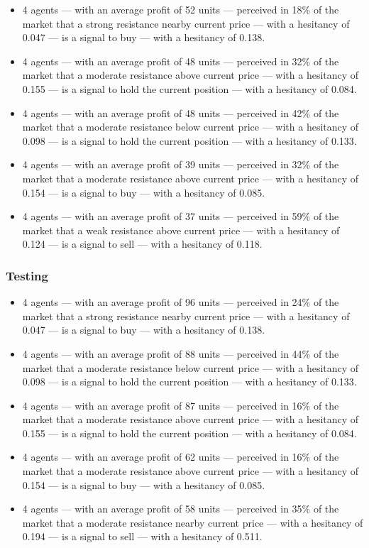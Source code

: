 {\small
  \begin{itemize}
  \item 4 agents — with an average profit of 52 units — perceived in 18\% of the
    market that a strong resistance nearby current price — with a hesitancy of
    0.047 — is a signal to buy — with a hesitancy of 0.138.
  \item 4 agents — with an average profit of 48 units — perceived in 32\% of the
    market that a moderate resistance above current price — with a hesitancy of
    0.155 — is a signal to hold the current position — with a hesitancy of
    0.084.
  \item 4 agents — with an average profit of 48 units — perceived in 42\% of the
    market that a moderate resistance below current price — with a hesitancy of
    0.098 — is a signal to hold the current position — with a hesitancy of
    0.133.
  \item 4 agents — with an average profit of 39 units — perceived in 32\% of the
    market that a moderate resistance above current price — with a hesitancy of
    0.154 — is a signal to buy — with a hesitancy of 0.085.
  \item 4 agents — with an average profit of 37 units — perceived in 59\% of the
    market that a weak resistance above current price — with a hesitancy of
    0.124 — is a signal to sell — with a hesitancy of 0.118.
  \end{itemize}
}

\subsubsection{Testing}

{\small
  \begin{itemize}
  \item 4 agents — with an average profit of 96 units — perceived in 24\% of the
    market that a strong resistance nearby current price — with a hesitancy of
    0.047 — is a signal to buy — with a hesitancy of 0.138.
  \item 4 agents — with an average profit of 88 units — perceived in 44\% of the
    market that a moderate resistance below current price — with a hesitancy of
    0.098 — is a signal to hold the current position — with a hesitancy of
    0.133.
  \item 4 agents — with an average profit of 87 units — perceived in 16\% of the
    market that a moderate resistance above current price — with a hesitancy of
    0.155 — is a signal to hold the current position — with a hesitancy of
    0.084.
  \item 4 agents — with an average profit of 62 units — perceived in 16\% of the
    market that a moderate resistance above current price — with a hesitancy of
    0.154 — is a signal to buy — with a hesitancy of 0.085.
  \item 4 agents — with an average profit of 58 units — perceived in 35\% of the
    market that a moderate resistance nearby current price — with a hesitancy of
    0.194 — is a signal to sell — with a hesitancy of 0.511.
  \end{itemize}
}

